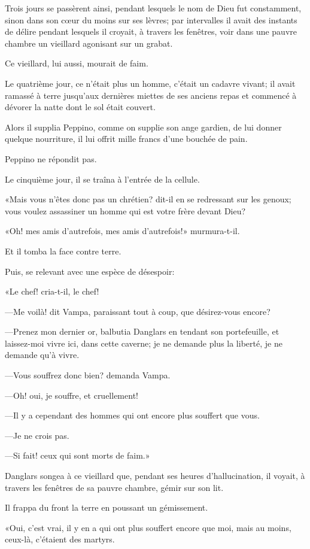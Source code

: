 Trois jours se passèrent ainsi, pendant lesquels le nom de Dieu fut constamment, sinon dans son cœur du moins sur ses lèvres; par intervalles il avait des instants de délire pendant lesquels il croyait, à travers les fenêtres, voir dans une pauvre chambre un vieillard agonisant sur un grabat. 

Ce vieillard, lui aussi, mourait de faim. 

Le quatrième jour, ce n'était plus un homme, c'était un cadavre vivant; il avait ramassé à terre jusqu'aux dernières miettes de ses anciens repas et commencé à dévorer la natte dont le sol était couvert. 

Alors il supplia Peppino, comme on supplie son ange gardien, de lui donner quelque nourriture, il lui offrit mille francs d'une bouchée de pain. 

Peppino ne répondit pas. 

Le cinquième jour, il se traîna à l'entrée de la cellule. 

«Mais vous n'êtes donc pas un chrétien? dit-il en se redressant sur les genoux; vous voulez assassiner un homme qui est votre frère devant Dieu? 

«Oh! mes amis d'autrefois, mes amis d'autrefois!» murmura-t-il. 

Et il tomba la face contre terre. 

Puis, se relevant avec une espèce de désespoir: 

«Le chef! cria-t-il, le chef! 

—Me voilà! dit Vampa, paraissant tout à coup, que désirez-vous encore? 

—Prenez mon dernier or, balbutia Danglars en tendant son portefeuille, et laissez-moi vivre ici, dans cette caverne; je ne demande plus la liberté, je ne demande qu'à vivre. 

—Vous souffrez donc bien? demanda Vampa. 

—Oh! oui, je souffre, et cruellement! 

—Il y a cependant des hommes qui ont encore plus souffert que vous. 

—Je ne crois pas. 

—Si fait! ceux qui sont morts de faim.» 

Danglars songea à ce vieillard que, pendant ses heures d'hallucination, il voyait, à travers les fenêtres de sa pauvre chambre, gémir sur son lit. 

Il frappa du front la terre en poussant un gémissement. 

«Oui, c'est vrai, il y en a qui ont plus souffert encore que moi, mais au moins, ceux-là, c'étaient des martyrs. 

